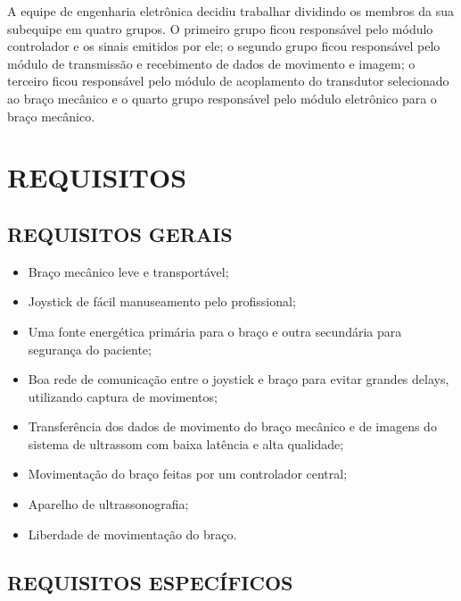 	A equipe de engenharia eletrônica decidiu trabalhar dividindo os membros da sua subequipe em quatro grupos. O primeiro grupo ficou responsável pelo módulo controlador e os sinais emitidos por ele; o segundo grupo ficou responsável pelo módulo de transmissão e recebimento de dados de movimento e imagem; o terceiro ficou responsável pelo módulo de acoplamento do transdutor selecionado ao braço mecânico e o quarto grupo responsável pelo módulo eletrônico para o braço mecânico.	 

\section{REQUISITOS}

\subsection{REQUISITOS GERAIS}

\begin{itemize}
\item Braço mecânico leve e transportável;
\item Joystick de fácil manuseamento pelo profissional;
\item Uma fonte energética primária para o braço e outra secundária para segurança do paciente;
\item Boa rede de comunicação entre o joystick e braço para evitar grandes delays, utilizando captura de movimentos;
\item Transferência dos dados de movimento do braço mecânico e de imagens do sistema de ultrassom com baixa latência e alta qualidade;
\item Movimentação do braço feitas por um controlador central;
\item Aparelho de ultrassonografia;
\item Liberdade de movimentação do braço.
\end{itemize}

\subsection{REQUISITOS ESPECÍFICOS}

